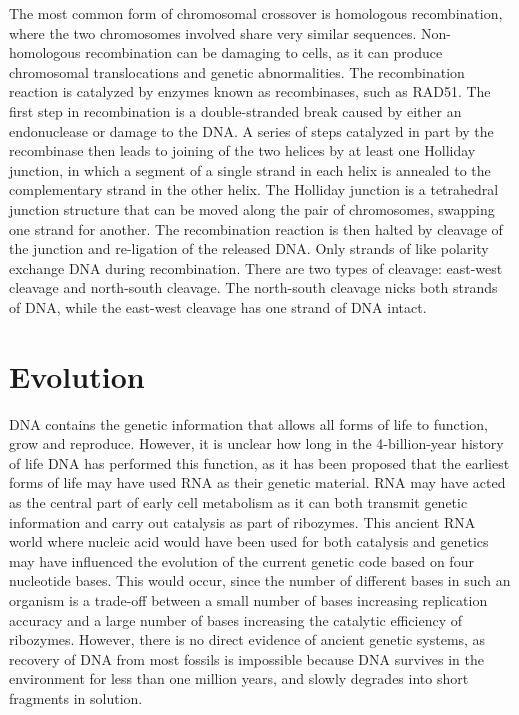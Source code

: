 The most common form of chromosomal crossover is homologous recombination, where the two chromosomes involved share very similar sequences. Non-homologous recombination can be damaging to cells, as it can produce chromosomal translocations and genetic abnormalities. The recombination reaction is catalyzed by enzymes known as recombinases, such as RAD51. The first step in recombination is a double-stranded break caused by either an endonuclease or damage to the DNA. A series of steps catalyzed in part by the recombinase then leads to joining of the two helices by at least one Holliday junction, in which a segment of a single strand in each helix is annealed to the complementary strand in the other helix. The Holliday junction is a tetrahedral junction structure that can be moved along the pair of chromosomes, swapping one strand for another. The recombination reaction is then halted by cleavage of the junction and re-ligation of the released DNA. Only strands of like polarity exchange DNA during recombination. There are two types of cleavage: east-west cleavage and north-south cleavage. The north-south cleavage nicks both strands of DNA, while the east-west cleavage has one strand of DNA intact.

\hypertarget{evolution}{%
\section{Evolution}\label{evolution}}

DNA contains the genetic information that allows all forms of life to function, grow and reproduce. However, it is unclear how long in the 4-billion-year history of life DNA has performed this function, as it has been proposed that the earliest forms of life may have used RNA as their genetic material. RNA may have acted as the central part of early cell metabolism as it can both transmit genetic information and carry out catalysis as part of ribozymes. This ancient RNA world where nucleic acid would have been used for both catalysis and genetics may have influenced the evolution of the current genetic code based on four nucleotide bases. This would occur, since the number of different bases in such an organism is a trade-off between a small number of bases increasing replication accuracy and a large number of bases increasing the catalytic efficiency of ribozymes. However, there is no direct evidence of ancient genetic systems, as recovery of DNA from most fossils is impossible because DNA survives in the environment for less than one million years, and slowly degrades into short fragments in solution.

